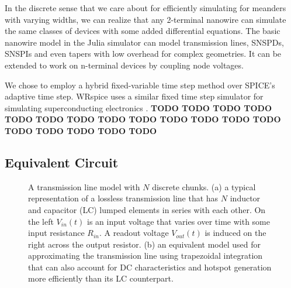 In the discrete sense that we care about for efficiently simulating for meanders with varying widths,
we can realize that any 2-terminal nanowire can simulate the same classes of devices with some added
differential equations. The basic nanowire model in the Julia simulator can model transmission lines,
SNSPDs, SNSPIs and even tapers with low overhead for complex geometries. It can be extended to work on 
n-terminal devices by coupling node voltages.

We chose to employ a hybrid fixed-variable time step method over SPICE's adaptive time step. WRspice uses a 
similar fixed time step simulator for simulating superconducting electronics \cite{wrspice}. 
\textbf{TODO TODO TODO TODO TODO TODO TODO TODO TODO TODO TODO TODO TODO TODO TODO TODO TODO TODO}

\subsection{Equivalent Circuit}

\begin{figure}
  \centering
  \subfigure[]{
    \label{fig:nw_tline_line}}
  \subfigure[]{
  
    \label{fig:nw_tline_chunk}}
  
  \caption{A transmission line model with $N$ discrete chunks. (a) a typical representation of a lossless transmission line that has $N$ inductor and capacitor (LC) lumped elements in series with each other. On the left $V_{in}(t)$ is an input voltage that varies over time with some input resistance $R_{in}$. A readout voltage $V_{out}(t)$ is induced on the right across the output resistor. (b) an equivalent model used for approximating the transmission line using trapezoidal integration that can also account for DC characteristics and hotspot generation more
  efficiently than its LC counterpart.}
  \label{fig:nw_tline}
\end{figure}

